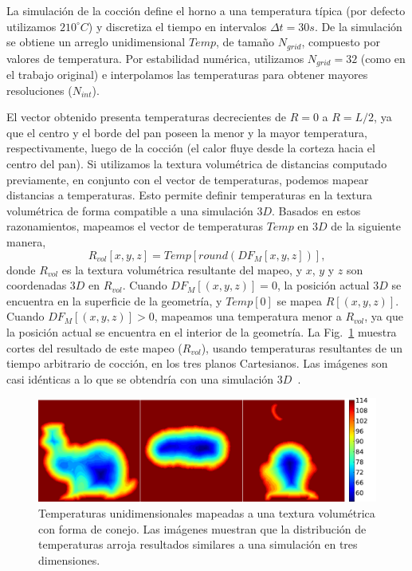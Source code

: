 La simulación de la cocción define el horno a una temperatura típica (por defecto utilizamos $210^{\circ}C$) y discretiza el tiempo en intervalos $\Delta t = 30s$.
De la simulación se obtiene un arreglo unidimensional $Temp$, de tamaño $N_{grid}$, compuesto por valores de temperatura.
Por estabilidad numérica, utilizamos $N_{grid}=32$ (como en el trabajo original) e interpolamos las temperaturas para obtener mayores resoluciones ($N_{int}$). 

El vector obtenido presenta temperaturas decrecientes de $R = 0$ a $R = L/2$, ya que el centro y el borde del pan poseen la menor y la mayor temperatura, respectivamente, luego de la cocción (el calor fluye desde la corteza hacia el centro del pan). 
Si utilizamos la textura volumétrica de distancias computado previamente, en conjunto con el vector de temperaturas, podemos mapear distancias a temperaturas.
Esto permite definir temperaturas en la textura volumétrica de forma compatible a una simulación $3D$.
Basados en estos razonamientos, mapeamos el vector de temperaturas $Temp$ en $3D$ de la siguiente manera,
\begin{equation*}
\displaystyle R_{vol}[x,y,z] = Temp[ round( DF_{M}[x,y,z] ) ], 
\end{equation*}
%
\noindent donde $R_{vol}$ es la textura volumétrica resultante del mapeo, y $x$, $y$ y $z$ son coordenadas $3D$ en $R_{vol}$. Cuando $DF_{M}[(x,y,z)] = 0$, la posición actual $3D$ se encuentra en la superficie de la geometría, y $Temp[0]$ se mapea $R[(x,y,z)]$.
Cuando $DF_{M}[(x,y,z)] > 0$, mapeamos una temperatura menor a $R_{vol}$, ya que la posición actual se encuentra en el interior de la geometría.
La Fig.~\ref{fg:baking} muestra cortes del resultado de este mapeo ($R_{vol}$), usando temperaturas resultantes de un tiempo arbitrario de cocción, en los tres planos Cartesianos. 
Las imágenes son casi idénticas a lo que se obtendría con una simulación $3D$~\cite{Purlis2010}.

\begin{figure}
\includegraphics[width=12cm]{figures/tempsbunny}
\caption[Temperaturas unidimensionales mapeadas a una textura volumétrica con forma de conejo]{Temperaturas unidimensionales mapeadas a una textura volumétrica con forma de conejo. Las imágenes muestran que la distribución de temperaturas arroja resultados similares a una simulación en tres dimensiones.}
\label{fg:baking}
\end{figure}

